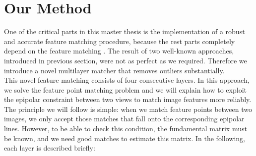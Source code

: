 \section {Our Method}
One of the critical parts in this master thesis is the implementation of a robust and accurate feature matching procedure, because the rest parts completely depend on the feature matching . The result of two well-known approaches, introduced in previous section, were not as perfect as we required. Therefore we introduce a novel multilayer matcher that removes outliers substantially.\\
This novel feature matching consists of four consecutive layers. In this approach, we solve the feature point matching problem and we will explain how to exploit the epipolar constraint between two views to match image features more reliably.\\
The principle we will follow is simple: when we match feature points between two images, we only accept those matches that fall onto the corresponding epipolar lines. However, to be able to check this condition, the fundamental matrix must be known, and we need good matches to estimate this matrix. 
In the following, each layer is described briefly:
